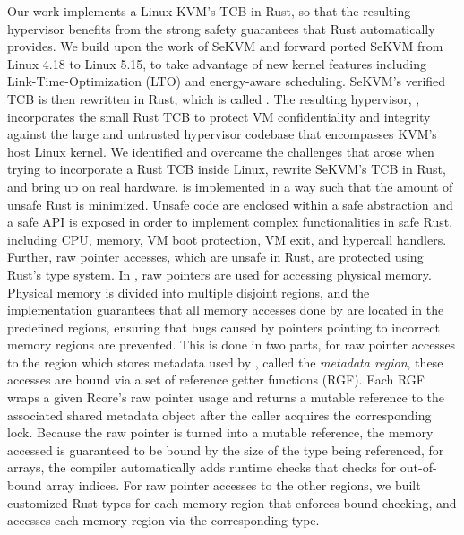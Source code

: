Our work implements a Linux KVM's TCB in Rust, so that the resulting hypervisor
benefits from the strong safety guarantees that Rust automatically provides.
We build upon the work of SeKVM \cite{sekvm} and forward ported SeKVM
from Linux 4.18 to Linux 5.15, to take advantage of new kernel features
including Link-Time-Optimization (LTO) and energy-aware scheduling. SeKVM's
verified TCB \textit{\secore{}} is then rewritten in Rust, which is called
\textit{\rustcore{}}.
The resulting hypervisor, \rustsec{}, incorporates the small Rust TCB
\rustcore{} to
protect VM confidentiality and integrity against the large and untrusted
hypervisor codebase that encompasses KVM’s host Linux kernel.
We identified and overcame the challenges that arose when trying to
incorporate a Rust TCB inside Linux, rewrite SeKVM's TCB in Rust, and bring up
\rustsec{} on real hardware.
\rustcore{} is implemented in a way such that the amount of unsafe Rust is
minimized.
Unsafe code are enclosed within a safe abstraction and a safe API is exposed
in order to implement complex functionalities in safe Rust, including CPU,
memory, VM boot protection, VM exit, and hypercall handlers.
Further, raw pointer accesses, which are unsafe in Rust, are protected using
Rust’s type system. In \rustcore{}, raw pointers are used for accessing
physical memory. Physical memory is divided into multiple disjoint regions,
and the \rustcore{} implementation guarantees that all memory accesses done by
\rustcore{} are located in the predefined regions, ensuring that bugs caused by
pointers pointing to incorrect memory regions are prevented.
This is done in two parts, for raw pointer accesses to the region which stores
metadata used by \rustcore{}, called the \textit{\rustcore{} metadata region},
these accesses are bound via a set of reference getter functions (RGF).
Each RGF wraps a given Rcore’s raw pointer usage and returns a mutable
reference to the associated shared metadata object after the caller acquires
the corresponding lock. Because the raw pointer is turned into a mutable
reference, the memory accessed is guaranteed to be bound by the size of the
type being referenced, for arrays, the compiler automatically adds runtime
checks that checks for out-of-bound array indices.
For raw pointer accesses to the other regions, we built customized Rust types
for each memory region that enforces bound-checking, and \rustcore{} accesses
each memory region via the corresponding type.

